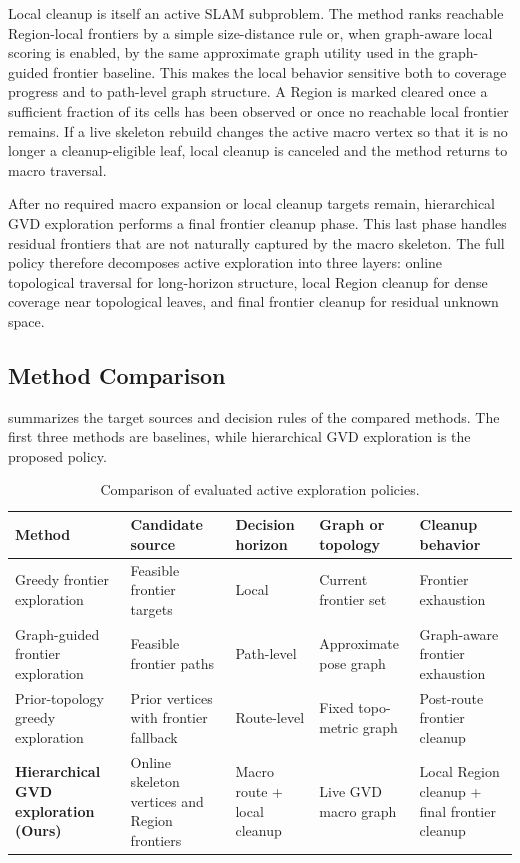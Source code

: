 \documentclass[conference]{IEEEtran}
\begin{document}
Local cleanup is itself an active SLAM subproblem. The method ranks reachable Region-local frontiers by a simple size-distance rule or, when graph-aware local scoring is enabled, by the same approximate graph utility used in the graph-guided frontier baseline. This makes the local behavior sensitive both to coverage progress and to path-level graph structure. A Region is marked cleared once a sufficient fraction of its cells has been observed or once no reachable local frontier remains. If a live skeleton rebuild changes the active macro vertex so that it is no longer a cleanup-eligible leaf, local cleanup is canceled and the method returns to macro traversal.

After no required macro expansion or local cleanup targets remain, hierarchical GVD exploration performs a final frontier cleanup phase. This last phase handles residual frontiers that are not naturally captured by the macro skeleton. The full policy therefore decomposes active exploration into three layers: online topological traversal for long-horizon structure, local Region cleanup for dense coverage near topological leaves, and final frontier cleanup for residual unknown space.

\subsection{Method Comparison}

 summarizes the target sources and decision rules of the compared methods. The first three methods are baselines, while hierarchical GVD exploration is the proposed policy.

\begin{table}[t]
\caption{Comparison of evaluated active exploration policies.}
\label{tab:method_comparison}
\centering
\small
\begin{tabular}{p{}p{}p{}p{}p{}}
\hline
Method & Candidate source & Decision horizon & Graph or topology & Cleanup behavior \\
\hline
Greedy frontier exploration & Feasible frontier targets & Local & Current frontier set & Frontier exhaustion \\
Graph-guided frontier exploration & Feasible frontier paths & Path-level & Approximate pose graph & Graph-aware frontier exhaustion \\
Prior-topology greedy exploration & Prior vertices with frontier fallback & Route-level & Fixed topo-metric graph & Post-route frontier cleanup \\
\textbf{Hierarchical GVD exploration (Ours)} & Online skeleton vertices and Region frontiers & Macro route + local cleanup & Live GVD macro graph & Local Region cleanup + final frontier cleanup \\
\hline
\end{tabular}
\end{table}
\end{document}
